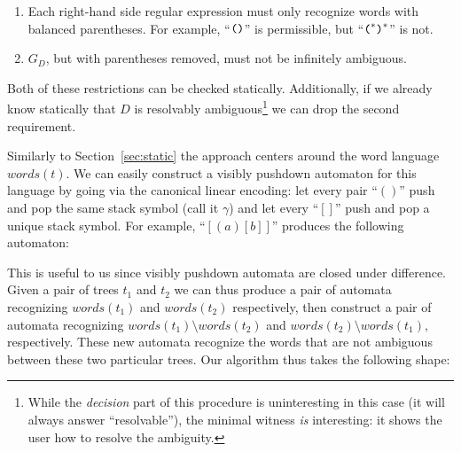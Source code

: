 \documentclass[runningheads]{llncs}
\newcommand{\words}{\mathit{words}} %
\newcommand{\reqpl}{(}
\newcommand{\reqpr}{)}
\newcommand{\reqp}[1]{\reqpl#1\reqpr}
\newcommand{\pospl}{[}
\newcommand{\pospr}{]}
\newcommand{\posp}[1]{\pospl#1\pospr}
\begin{document}
\begin{enumerate}
\item Each right-hand side regular expression must only recognize words with balanced parentheses. For example, ``$\verb|(| \verb|)|$'' is permissible, but ``$\verb|(|^{*} \verb|)|^{*}$'' is not.
\item $G_D$, but with parentheses removed, must not be infinitely ambiguous.
\end{enumerate}

\noindent Both of these restrictions can be checked statically. Additionally, if we already know statically that $D$ is resolvably ambiguous\footnote{While the \emph{decision} part of this procedure is uninteresting in this case (it will always answer ``resolvable''), the minimal witness \emph{is} interesting: it shows the user how to resolve the ambiguity.} we can drop the second requirement.

Similarly to Section~\ref{sec:static} the approach centers around the word language $\words(t)$. We can easily construct a visibly pushdown automaton for this language by going via the canonical linear encoding: let every pair ``$\reqp{}$'' push and pop the same stack symbol (call it $\gamma$) and let every ``$\posp{}$'' push and pop a unique stack symbol. For example, ``$\posp{\reqp{a}\posp{b}}$'' produces the following automaton:

\begin{center}
\end{center}

\noindent This is useful to us since visibly pushdown automata are closed under difference. Given a pair of trees $t_1$ and $t_2$ we can thus produce a pair of automata recognizing $\words(t_1)$ and $\words(t_2)$ respectively, then construct a pair of automata recognizing $\words(t_1) \setminus \words(t_2)$ and $\words(t_2) \setminus \words(t_1)$, respectively. These new automata recognize the words that are not ambiguous between these two particular trees. Our algorithm thus takes the following shape:
\end{document}
